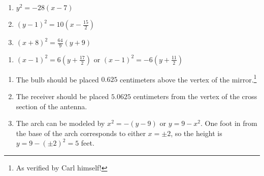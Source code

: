 \documentclass{ximera}
\begin{document}
\begin{multicols}{3}
\begin{enumerate}
\setcounter{enumi}{\value{HW}}

\item $y^{2} = -28(x - 7)$
\item $(y - 1)^{2} = 10\left(x - \frac{15}{2} \right)$
\item $(x + 8)^{2} = \frac{64}{9}(y + 9)$

\setcounter{HW}{\value{enumi}}
\end{enumerate}
\end{multicols}

\begin{enumerate}
\setcounter{enumi}{\value{HW}}


\item $(x - 1)^{2} = 6\left(y + \frac{17}{2}\right)$ or $(x - 1)^{2} = -6\left(y + \frac{11}{2}\right)$

\setcounter{HW}{\value{enumi}}
\end{enumerate}





\begin{enumerate}
\setcounter{enumi}{\value{HW}}

\item  The bulb should be placed $0.625$ centimeters above the vertex of the mirror.\footnote{As verified by Carl himself!}

\item  The receiver should be placed $5.0625$ centimeters from the vertex of the cross section of the antenna.

\item  The arch can be modeled by $x^2=-(y-9)$ or $y=9-x^2$.  One foot in from the base of the arch corresponds to either $x = \pm 2$, so the height is $y=9-(\pm 2)^2=5$ feet.

\end{enumerate}
\end{document}

